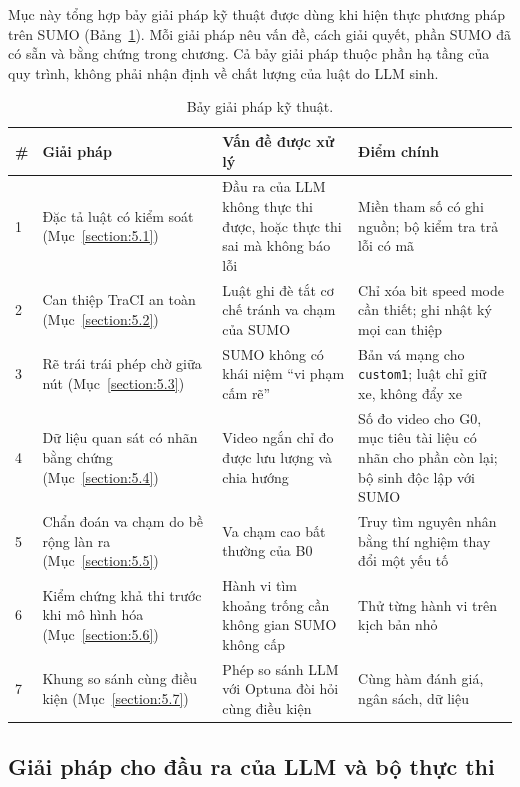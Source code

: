 \documentclass[../main.tex]{subfiles}
\begin{document}
Mục này tổng hợp bảy giải pháp kỹ thuật được dùng khi hiện thực phương pháp trên SUMO (Bảng~\ref{table:5.0}). Mỗi giải pháp nêu vấn đề, cách giải quyết, phần SUMO đã có sẵn và bằng chứng trong chương. Cả bảy giải pháp thuộc phần hạ tầng của quy trình, không phải nhận định về chất lượng của luật do LLM sinh.

\begin{table}[!htbp]
\centering
\small
\caption{Bảy giải pháp kỹ thuật.} \label{table:5.0}
\begin{tabular}{|p{0.6cm}|>{\raggedright\arraybackslash}p{3.6cm}|>{\raggedright\arraybackslash}p{4.3cm}|>{\raggedright\arraybackslash}p{4.7cm}|}
\hline
\textbf{\#} & \textbf{Giải pháp} & \textbf{Vấn đề được xử lý} & \textbf{Điểm chính} \\ \hline
1 & Đặc tả luật có kiểm soát (Mục~\ref{section:5.1}) & Đầu ra của LLM không thực thi được, hoặc thực thi sai mà không báo lỗi & Miền tham số có ghi nguồn; bộ kiểm tra trả lỗi có mã \\ \hline
2 & Can thiệp TraCI an toàn (Mục~\ref{section:5.2}) & Luật ghi đè tắt cơ chế tránh va chạm của SUMO & Chỉ xóa bit speed mode cần thiết; ghi nhật ký mọi can thiệp \\ \hline
3 & Rẽ trái trái phép chờ giữa nút (Mục~\ref{section:5.3}) & SUMO không có khái niệm ``vi phạm cấm rẽ'' & Bản vá mạng cho \texttt{custom1}; luật chỉ giữ xe, không đẩy xe \\ \hline
4 & Dữ liệu quan sát có nhãn bằng chứng (Mục~\ref{section:5.4}) & Video ngắn chỉ đo được lưu lượng và chia hướng & Số đo video cho G0, mục tiêu tài liệu có nhãn cho phần còn lại; bộ sinh độc lập với SUMO \\ \hline
5 & Chẩn đoán va chạm do bề rộng làn ra (Mục~\ref{section:5.5}) & Va chạm cao bất thường của B0 & Truy tìm nguyên nhân bằng thí nghiệm thay đổi một yếu tố \\ \hline
6 & Kiểm chứng khả thi trước khi mô hình hóa (Mục~\ref{section:5.6}) & Hành vi tìm khoảng trống cần không gian SUMO không cấp & Thử từng hành vi trên kịch bản nhỏ \\ \hline
7 & Khung so sánh cùng điều kiện (Mục~\ref{section:5.7}) & Phép so sánh LLM với Optuna đòi hỏi cùng điều kiện & Cùng hàm đánh giá, ngân sách, dữ liệu \\ \hline
\end{tabular}
\end{table}

\subsection{Giải pháp cho đầu ra của LLM và bộ thực thi}
\label{subsection:solutions_exec}
\end{document}
